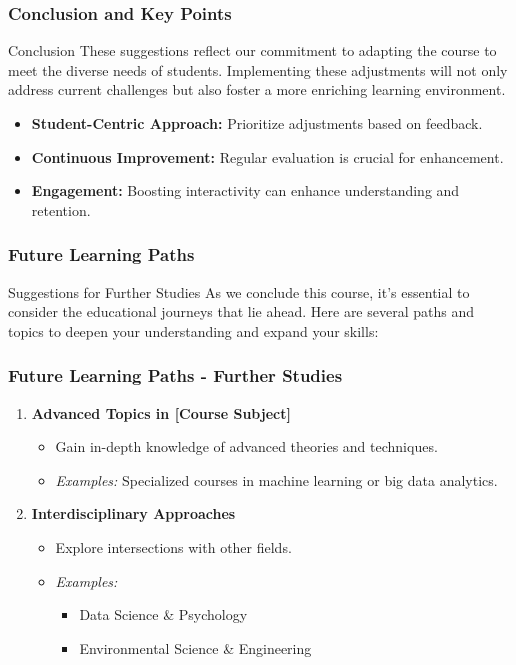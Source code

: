\documentclass[aspectratio=169]{beamer}
\begin{document}
\begin{frame}[fragile]
    \frametitle{Conclusion and Key Points}
    
    \begin{block}{Conclusion}
        These suggestions reflect our commitment to adapting the course to meet the diverse needs of students. Implementing these adjustments will not only address current challenges but also foster a more enriching learning environment.
    \end{block}
    
    \begin{itemize}
        \item \textbf{Student-Centric Approach:} Prioritize adjustments based on feedback.
        \item \textbf{Continuous Improvement:} Regular evaluation is crucial for enhancement.
        \item \textbf{Engagement:} Boosting interactivity can enhance understanding and retention.
    \end{itemize}
\end{frame}

\begin{frame}[fragile]
    \frametitle{Future Learning Paths}
    \begin{block}{Suggestions for Further Studies}
        As we conclude this course, it's essential to consider the educational journeys that lie ahead. Here are several paths and topics to deepen your understanding and expand your skills:
    \end{block}
\end{frame}

\begin{frame}[fragile]
    \frametitle{Future Learning Paths - Further Studies}
    \begin{enumerate}
        \item \textbf{Advanced Topics in [Course Subject]}
        \begin{itemize}
            \item Gain in-depth knowledge of advanced theories and techniques.
            \item \textit{Examples:} Specialized courses in machine learning or big data analytics.
        \end{itemize}
        
        \item \textbf{Interdisciplinary Approaches}
        \begin{itemize}
            \item Explore intersections with other fields.
            \item \textit{Examples:} 
            \begin{itemize}
                \item Data Science \& Psychology
                \item Environmental Science \& Engineering
            \end{itemize}
        \end{itemize}
    \end{enumerate}
\end{frame}
\end{document}
